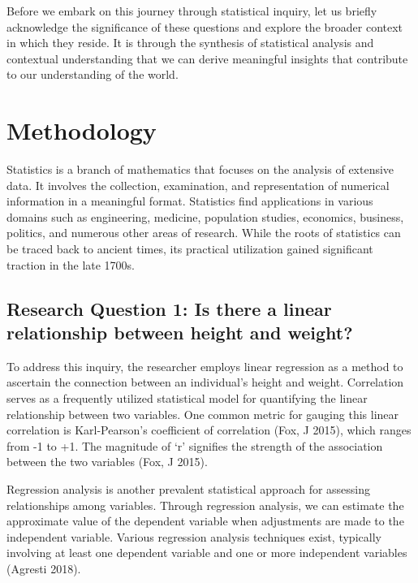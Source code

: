 \documentclass[
]{article}
\begin{document}
Before we embark on this journey through statistical inquiry, let us briefly acknowledge the significance of these questions and explore the broader context in which they reside. It is through the synthesis of statistical analysis and contextual understanding that we can derive meaningful insights that contribute to our understanding of the world.

\newpage

\hypertarget{methodology}{%
\section{Methodology}\label{methodology}}

Statistics is a branch of mathematics that focuses on the analysis of extensive data. It involves the collection, examination, and representation of numerical information in a meaningful format. Statistics find applications in various domains such as engineering, medicine, population studies, economics, business, politics, and numerous other areas of research. While the roots of statistics can be traced back to ancient times, its practical utilization gained significant traction in the late 1700s.

\hypertarget{research-question-1-is-there-a-linear-relationship-between-height-and-weight}{%
\subsection{Research Question 1: Is there a linear relationship between height and weight?}\label{research-question-1-is-there-a-linear-relationship-between-height-and-weight}}

To address this inquiry, the researcher employs linear regression as a method to ascertain the connection between an individual's height and weight. Correlation serves as a frequently utilized statistical model for quantifying the linear relationship between two variables. One common metric for gauging this linear correlation is Karl-Pearson's coefficient of correlation (Fox, J 2015), which ranges from -1 to +1. The magnitude of `r' signifies the strength of the association between the two variables (Fox, J 2015).

Regression analysis is another prevalent statistical approach for assessing relationships among variables. Through regression analysis, we can estimate the approximate value of the dependent variable when adjustments are made to the independent variable. Various regression analysis techniques exist, typically involving at least one dependent variable and one or more independent variables (Agresti 2018).
\end{document}
